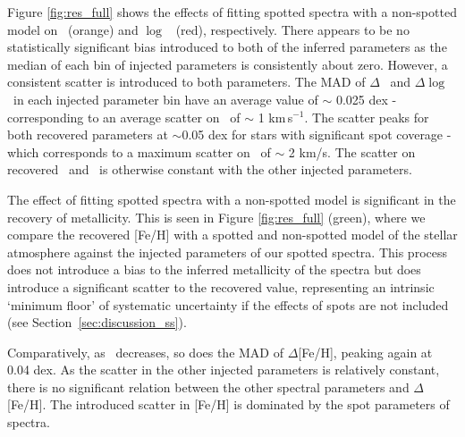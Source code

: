 Figure \ref{fig:res_full} shows the effects of fitting spotted spectra with a non-spotted model on \logg\ (orange) and $\log$ \vsini\ (red), respectively.
There appears to be no statistically significant bias introduced to both of the inferred parameters as the median of each bin of injected parameters is consistently about zero. However, a consistent scatter is introduced to both parameters. The MAD of $\Delta$ \logg\ and $\Delta \log$ \vsini\ in each injected parameter bin have an average value of $\sim$ 0.025 dex - corresponding to an average scatter on \vsini\ of $\sim$ 1 km\,s$^{-1}$. The scatter peaks for both recovered parameters at $\sim$0.05 dex for stars with significant spot coverage - which corresponds to a maximum scatter on \vsini\ of $\sim$ 2 km/s. The scatter on recovered \vsini\ and \logg\ is otherwise constant with the other injected parameters.

The effect of fitting spotted spectra with a non-spotted model is significant in the recovery of metallicity. This is seen in Figure \ref{fig:res_full} (green), where we compare the recovered [Fe/H] with a spotted and non-spotted model of the stellar atmosphere against the injected parameters of our spotted spectra. This process does not introduce a bias to the inferred metallicity of the spectra but does introduce a significant scatter to the recovered value, representing an intrinsic `minimum floor' of systematic uncertainty if the effects of spots are not included (see Section~\ref{sec:discussion_ss}).

 Comparatively, as \xspot\ decreases, so does the MAD of $\Delta$[Fe/H], peaking again at 0.04 dex. As the scatter in the other injected parameters is relatively constant, there is no significant relation between the other spectral parameters and $\Delta$[Fe/H]. The introduced scatter in [Fe/H] is dominated by the spot parameters of spectra.


